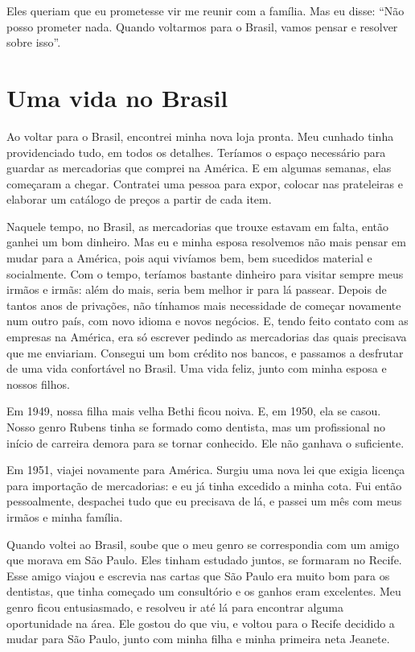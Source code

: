 Eles queriam que eu prometesse vir me reunir
com a família. Mas eu disse: ``Não posso prometer nada. Quando 
voltarmos para o Brasil, vamos pensar e resolver sobre isso''.

\chapter{Uma vida no Brasil}

Ao voltar para o Brasil, encontrei minha nova loja pronta. Meu
cunhado tinha providenciado tudo, em todos os detalhes. Teríamos
o espaço necessário para guardar as mercadorias que comprei na América. 
E em algumas semanas, elas começaram a chegar. Contratei
uma pessoa para expor, colocar nas
prateleiras e elaborar um catálogo de preços a partir de cada item.

Naquele tempo, no Brasil, as mercadorias que trouxe estavam em falta, 
então ganhei um bom dinheiro. Mas eu e minha
esposa resolvemos não mais pensar em mudar para a América, pois 
aqui vivíamos bem, bem sucedidos material e socialmente. Com o tempo, 
teríamos bastante dinheiro para visitar sempre meus irmãos e irmãs: além do mais, 
seria bem melhor ir para lá passear. Depois de tantos anos de privações, não
tínhamos mais necessidade de começar novamente num outro país, com 
novo idioma e novos negócios. E, tendo feito contato com as empresas na América, 
era só escrever pedindo as mercadorias das quais precisava que me
enviariam. Consegui um bom crédito nos bancos, e passamos a desfrutar de
uma vida confortável no Brasil. Uma vida feliz, junto com minha
esposa e nossos filhos.

Em 1949, nossa filha mais velha Bethi ficou noiva. E, em 1950, ela se
casou. Nosso genro Rubens tinha se formado como dentista, mas um
profissional no início de carreira demora para se tornar conhecido. Ele não ganhava o suficiente.

Em 1951, viajei novamente para América. Surgiu uma
nova lei que exigia licença para importação de mercadorias: e eu já tinha excedido a minha cota. Fui então pessoalmente, despachei tudo que eu precisava de lá, e passei um mês com meus irmãos e minha família.

Quando voltei ao Brasil, soube que o meu genro se correspondia 
com um amigo que morava em São Paulo. Eles tinham estudado
juntos, se formaram no Recife. Esse amigo viajou e escrevia nas cartas
que São Paulo era muito bom para os dentistas, que tinha começado um
consultório e os ganhos eram excelentes. Meu genro ficou
entusiasmado, e resolveu ir até lá para encontrar alguma oportunidade na área. Ele gostou do que viu, e voltou para o Recife decidido a mudar para São Paulo, junto com minha filha e
minha primeira neta Jeanete.

